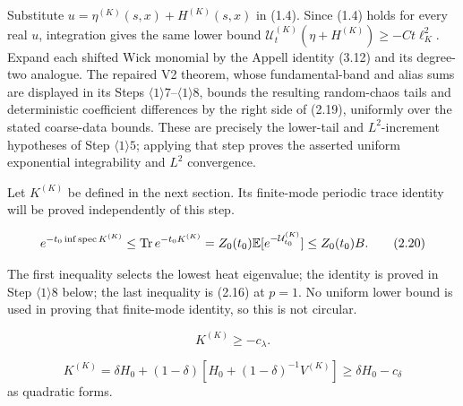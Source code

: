 \documentclass[11pt,a4paper]{article}
\newcommand{\U}{\mathcal U}
\newcommand{\Tr}{\operatorname{Tr}}
\begin{document}


\Because Substitute $u=\eta^{(K)}(s,x)+H^{(K)}(s,x)$ in (1.4).  Since (1.4)
holds for every real $u$, integration gives the same lower bound
$\U_t^{(K)}(\eta+H^{(K)})\ge-Ct\ell_K^2$.  Expand each shifted Wick monomial by
the Appell identity (3.12) and its degree-two analogue.  The repaired V2 theorem,
whose fundamental-band and alias sums are displayed in its Steps
$\langle1\rangle7$--$\langle1\rangle8$, bounds the resulting random-chaos tails
and deterministic coefficient differences by the right side of (2.19), uniformly
over the stated coarse-data bounds.  These are precisely the lower-tail and
$L^2$-increment hypotheses of Step $\langle1\rangle5$; applying that step proves
the asserted uniform exponential integrability and $L^2$ convergence.

\QedStep


Let $K^{(K)}$ be defined in the next section.  Its finite-mode periodic trace
identity will be proved independently of this step.

\[
 e^{-t_0\inf\spec K^{(K)}}\le\Tr e^{-t_0K^{(K)}}
 =Z_0(t_0)\E[e^{-\U_{t_0}^{(K)}}]\le Z_0(t_0)B.
\tag{2.20}
\]

\Because The first inequality selects the lowest heat eigenvalue; the identity is
proved in Step $\langle1\rangle8$ below; the last inequality is (2.16) at $p=1$.
No uniform lower bound is used in proving that finite-mode identity, so this is not
circular.

\[
 K^{(K)}\ge-c_\lambda.
\tag{2.21}
\]

\[
 K^{(K)}=\delta H_0+(1-\delta)
 \left[H_0+(1-\delta)^{-1}V^{(K)}\right]
 \ge\delta H_0-c_\delta
\tag{2.22}
\]
as quadratic forms.

\QedStep
\end{document}
